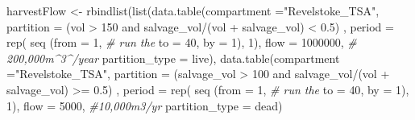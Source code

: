 \documentclass[
]{article}
\newenvironment{Shaded}{\begin{snugshade}}{\end{snugshade}}
\newcommand{\AttributeTok}[1]{\textcolor[rgb]{0.77,0.63,0.00}{#1}}
\newcommand{\CommentTok}[1]{\textcolor[rgb]{0.56,0.35,0.01}{\textit{#1}}}
\newcommand{\DecValTok}[1]{\textcolor[rgb]{0.00,0.00,0.81}{#1}}
\newcommand{\FunctionTok}[1]{\textcolor[rgb]{0.00,0.00,0.00}{#1}}
\newcommand{\NormalTok}[1]{#1}
\newcommand{\OtherTok}[1]{\textcolor[rgb]{0.56,0.35,0.01}{#1}}
\newcommand{\StringTok}[1]{\textcolor[rgb]{0.31,0.60,0.02}{#1}}
\begin{document}
\begin{Shaded}
\begin{Highlighting}[]
\NormalTok{harvestFlow }\OtherTok{\textless{}{-}} \FunctionTok{rbindlist}\NormalTok{(}\FunctionTok{list}\NormalTok{(}\FunctionTok{data.table}\NormalTok{(}\AttributeTok{compartment =}\StringTok{"Revelstoke\_TSA"}\NormalTok{,}
                                         \AttributeTok{partition =} \StringTok{\textquotesingle{}  (vol \textgreater{} 150 and salvage\_vol/(vol + salvage\_vol) \textless{} 0.5) \textquotesingle{}}\NormalTok{, }
                                         \AttributeTok{period =} \FunctionTok{rep}\NormalTok{( }\FunctionTok{seq}\NormalTok{ (}\AttributeTok{from =} \DecValTok{1}\NormalTok{, }\CommentTok{\# run the }
                                                      \AttributeTok{to =} \DecValTok{40}\NormalTok{, }
                                                      \AttributeTok{by =} \DecValTok{1}\NormalTok{),}
                                                    \DecValTok{1}\NormalTok{), }
                                         \AttributeTok{flow =} \DecValTok{1000000}\NormalTok{, }\CommentTok{\# 200,000m\^{}3\^{}/year}
                                         \AttributeTok{partition\_type =} \StringTok{\textquotesingle{}live\textquotesingle{}}\NormalTok{), }
                              \FunctionTok{data.table}\NormalTok{(}\AttributeTok{compartment =}\StringTok{"Revelstoke\_TSA"}\NormalTok{,}
                                         \AttributeTok{partition =} \StringTok{\textquotesingle{} (salvage\_vol \textgreater{} 100 and salvage\_vol/(vol + salvage\_vol) \textgreater{}= 0.5) \textquotesingle{}}\NormalTok{, }
                                         \AttributeTok{period =} \FunctionTok{rep}\NormalTok{( }\FunctionTok{seq}\NormalTok{ (}\AttributeTok{from =} \DecValTok{1}\NormalTok{, }\CommentTok{\# run the }
                                                      \AttributeTok{to =} \DecValTok{40}\NormalTok{, }
                                                      \AttributeTok{by =} \DecValTok{1}\NormalTok{),}
                                                    \DecValTok{1}\NormalTok{), }
                                         \AttributeTok{flow =} \DecValTok{5000}\NormalTok{, }\CommentTok{\#10,000m3/yr }
                                         \AttributeTok{partition\_type =} \StringTok{\textquotesingle{}dead\textquotesingle{}}\NormalTok{)}
                              

\end{Highlighting}
\end{Shaded}
\end{document}
